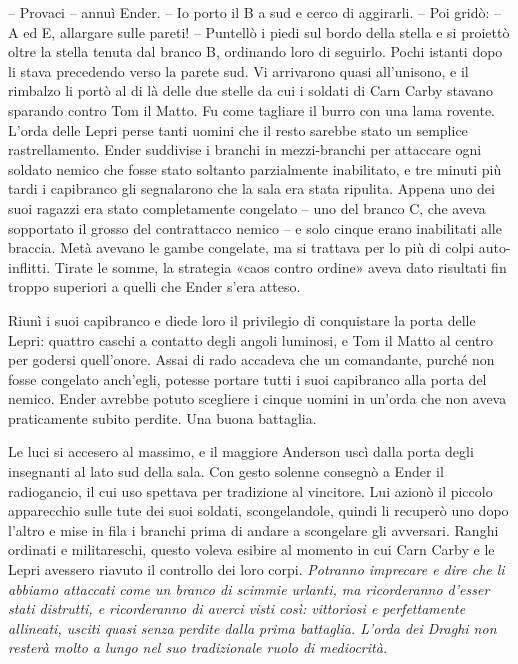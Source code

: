 {-- Provaci -- annuì Ender. -- Io porto il B a sud e cerco di aggirarli.
	-- Poi gridò: -- A ed E, allargare sulle pareti! -- Puntellò i piedi sul
	bordo della stella e si proiettò oltre la stella tenuta dal branco B,
	ordinando loro di seguirlo. Pochi istanti dopo li stava precedendo verso
	la parete sud. Vi arrivarono quasi all'unisono, e il rimbalzo li portò
	al di là delle due stelle da cui i soldati di Carn Carby stavano
	sparando contro Tom il Matto. Fu come tagliare il burro con una lama
	rovente. L'orda delle Lepri perse tanti uomini che il resto sarebbe
	stato un semplice rastrellamento. Ender suddivise i branchi in
	mezzi-branchi per attaccare ogni soldato nemico che fosse stato soltanto
	parzialmente inabilitato, e tre minuti più tardi i capibranco gli
	segnalarono che la sala era stata ripulita. Appena uno dei suoi ragazzi
	era stato completamente congelato -- uno del branco C, che aveva
	sopportato il grosso del contrattacco nemico -- e solo cinque erano
	inabilitati alle braccia. Metà avevano le gambe congelate, ma si
	trattava per lo più di colpi auto-inflitti. Tirate le somme, la
	strategia «caos contro ordine» aveva dato risultati fin troppo superiori
	a quelli che Ender s'era atteso.}

{Riunì i suoi capibranco e diede loro il privilegio di conquistare la
	porta delle Lepri: quattro caschi a contatto degli angoli luminosi, e
	Tom il Matto al centro per godersi quell'onore. Assai di rado accadeva
	che un comandante, purché non fosse congelato anch'egli, potesse portare
	tutti i suoi capibranco alla porta del nemico. Ender avrebbe potuto
	scegliere i cinque uomini in un'orda che non aveva praticamente subito
	perdite. Una buona battaglia.}

{Le luci si accesero al massimo, e il maggiore Anderson uscì dalla porta
	degli insegnanti al lato sud della sala. Con gesto solenne consegnò a
	Ender il radiogancio, il cui uso spettava per tradizione al vincitore.
	Lui azionò il piccolo apparecchio sulle tute dei suoi soldati,
	scongelandole, quindi li recuperò uno dopo l'altro e mise in fila i
	branchi prima di andare a scongelare gli avversari. Ranghi ordinati e
	militareschi, questo voleva esibire al momento in cui Carn Carby e le
	Lepri avessero riavuto il controllo dei loro corpi. \emph{Potranno
		imprecare e dire che li abbiamo attaccati come un branco di scimmie
		urlanti, ma ricorderanno d'esser stati distrutti, e ricorderanno di
		averci visti così: vittoriosi e perfettamente allineati, usciti quasi
		senza perdite dalla prima battaglia. L'orda dei Draghi non resterà molto
		a lungo nel suo tradizionale ruolo di mediocrità.}}

